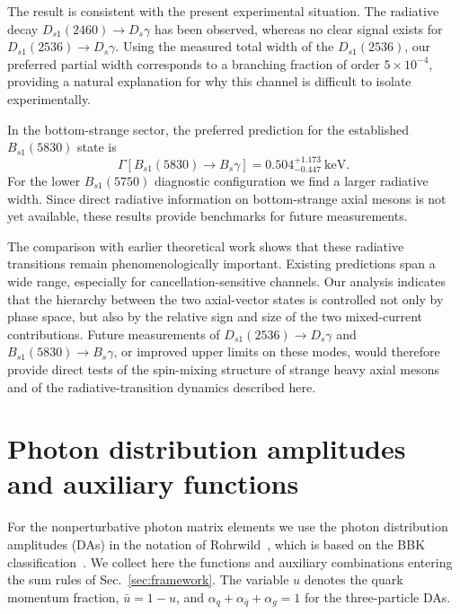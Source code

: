 \documentclass[aps,prd,preprint,nofootinbib,superscriptaddress]{revtex4-2}
\newcommand{\Ds}{D_s}
\newcommand{\Dsone}{D_{s1}}
\newcommand{\Bs}{B_s}
\newcommand{\Bsone}{B_{s1}}
\newcommand{\keV}{\mathrm{keV}}
\begin{document}
The result is consistent with the present experimental situation.  The
radiative decay $\Dsone(2460)\to\Ds\gamma$ has been observed, whereas no clear
signal exists for $\Dsone(2536)\to\Ds\gamma$.  Using the measured total width
of the $\Dsone(2536)$, our preferred partial width corresponds to a branching
fraction of order $5\times10^{-4}$, providing a natural explanation for why
this channel is difficult to isolate experimentally.

In the bottom-strange sector, the preferred prediction for the established
$\Bsone(5830)$ state is
\begin{equation}
  \Gamma[\Bsone(5830)\to\Bs\gamma]
  =
  0.504^{+1.173}_{-0.447}~\keV .
\end{equation}
For the lower \(\Bsone(5750)\) diagnostic configuration we find a larger
radiative width.  Since direct radiative information on bottom-strange axial
mesons is not yet available, these results provide benchmarks for future
measurements.

The comparison with earlier theoretical work shows that these radiative
transitions remain phenomenologically important.  Existing predictions span a
wide range, especially for cancellation-sensitive channels.  Our analysis
indicates that the hierarchy between the two axial-vector states is controlled
not only by phase space, but also by the relative sign and size of the two
mixed-current contributions.  Future measurements of
$\Dsone(2536)\to\Ds\gamma$ and $\Bsone(5830)\to\Bs\gamma$, or improved upper
limits on these modes, would therefore provide direct tests of the spin-mixing
structure of strange heavy axial mesons and of the radiative-transition
dynamics described here.


\appendix

\section{Photon distribution amplitudes and auxiliary functions}
\label{app:sumrule-expressions}

For the nonperturbative photon matrix elements we use the photon distribution
amplitudes (DAs) in the notation of Rohrwild~\cite{Rohrwild:2007yt}, which is
based on the BBK classification~\cite{Ball:2002ps}.  We collect here the
functions and auxiliary combinations entering the sum rules of
Sec.~\ref{sec:framework}.  The variable $u$ denotes the quark momentum
fraction, $\bar u=1-u$, and
$\alpha_q+\alpha_{\bar q}+\alpha_g=1$ for the three-particle DAs.
\end{document}
